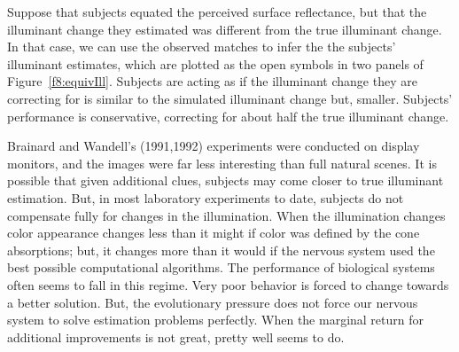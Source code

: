 Suppose that subjects equated the perceived surface reflectance, but
that the illuminant change they estimated was different from the true
illuminant change.  In that case, we can use the observed matches to
infer the the subjects' illuminant estimates, which are plotted as the
open symbols in two panels of Figure~\ref{f8:equivIll}.  Subjects are
acting as if the illuminant change they are correcting for is similar
to the simulated illuminant change but, smaller.  Subjects'
performance is conservative, correcting for about half the true
illuminant change.

Brainard and Wandell's (1991,1992) experiments were conducted on display
monitors, and the images were far less interesting than full natural
scenes.  It is possible that given additional clues, subjects may come
closer to true illuminant estimation.  But, in most laboratory
experiments to date, subjects do not compensate fully for changes in
the illumination.  When the illumination changes color appearance
changes less than it might if color was defined by the cone
absorptions; but, it changes more than it would if the nervous system
used the best possible computational algorithms.  The performance of
biological systems often seems to fall in this regime.  Very poor
behavior is forced to change towards a better solution.  But, the
evolutionary pressure does not force our nervous system to solve
estimation problems perfectly.  When the marginal return for
additional improvements is not great, pretty well seems to do.
